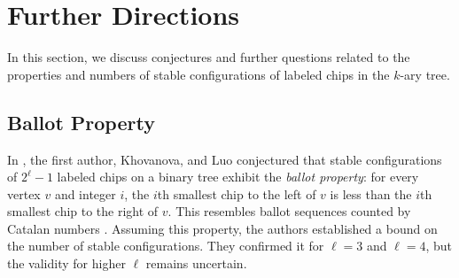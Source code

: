 \documentclass[11pt]{article}
\newtheorem{prop}[theorem]{Proposition}
\theoremstyle{remark}
\theoremstyle{definition}
\begin{document}

\section{Further Directions}\label{sec:Further}
In this section, we discuss conjectures and further questions related to the properties and numbers of stable configurations of labeled chips in the $k$-ary tree.
\subsection{Ballot Property}

In \cite{inagaki2024chipfiringundirectedbinarytrees}, the first author, Khovanova, and Luo conjectured that stable configurations of $2^{\ell}-1$ labeled chips on a binary tree exhibit the \emph{ballot property}: for every vertex \(v\) and integer \(i\), the $i$th smallest chip to the left of \(v\) is less than the $i$th smallest chip to the right of $v$. This resembles ballot sequences counted by Catalan numbers \cite{MR3467982}. Assuming this property, the authors established a bound on the number of stable configurations. They confirmed it for $\ell=3$ and $\ell=4$, but the validity for higher $\ell$ remains uncertain.
\end{document}
